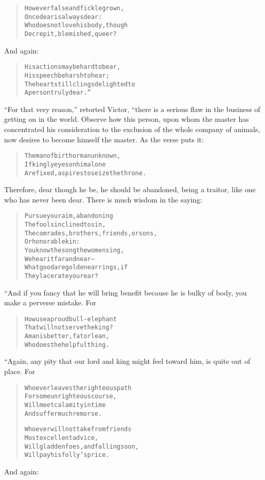 \documentclass[article, twoside, 14pt]{memoir}
\renewenvironment{verbatim}{%
\begin{quote}%
\vskip -10pt%
\begin{alltt}\normalfont\large}{\end{alltt}%
\end{quote}%
\vskip -10pt
} %
\begin{document}
\begin{verbatim}
However false and fickle grown,
    Once dear is always dear:
Who does not love his body, though
    Decrepit, blemished, queer?
\end{verbatim}
And again:

\begin{verbatim}
His actions may be hard to bear,
    His speech be harsh to hear;
The heart still clings delighted to
    A person truly dear.”
\end{verbatim}
``For that very reason,'' retorted Victor, “there is a serious flaw
in the business of getting on in the world. Observe how this
person, upon whom the master has concentrated his consideration to
the exclusion of the whole company of animals, now desires to
become himself the master. As the verse puts it:

\begin{verbatim}
The man of birth or man unknown,
If kingly eyes on him alone
Are fixed, aspires to seize the throne.
\end{verbatim}
Therefore, dear though he be, he should be abandoned, being a
traitor, like one who has never been dear. There is much wisdom in
the saying:

\begin{verbatim}
Pursue your aim, abandoning
    The fools inclined to sin,
The comrades, brothers, friends, or sons,
    Or honorable kin:
You know the song the women sing,
    We hear it far and near--
What good are golden earrings, if
    They lacerate your ear?
\end{verbatim}
“And if you fancy that he will bring benefit because he is bulky of
body, you make a perverse mistake. For

\begin{verbatim}
How use a proud bull-elephant
    That will not serve the king?
A man is better, fat or lean,
    Who does the helpful thing.
\end{verbatim}
“Again, any pity that our lord and king might feel toward him, is
quite out of place. For

\begin{verbatim}
Whoever leaves the righteous path
    For some unrighteous course,
Will meet calamity in time
    And suffer much remorse.

Whoever will not take from friends
    Most excellent advice,
Will gladden foes, and falling soon,
    Will pay his folly's price.
\end{verbatim}
And again:
\end{document}
